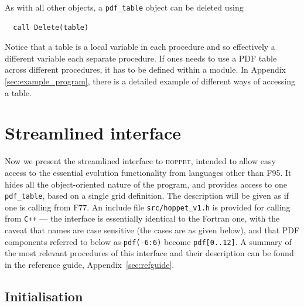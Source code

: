 \documentclass[12pt]{article}
\newcommand{\hoppet}{\textsc{hoppet}\xspace}
\newcommand{\ttt}[1]{\texttt{#1}}
\begin{document}
As with all other objects, a \ttt{pdf\_table} object can be deleted
using
\begin{lstlisting}
  call Delete(table) 
\end{lstlisting}
Notice that a table is a local variable in each procedure and so 
effectively a different variable each separate
procedure. 
If ones needs to use a 
PDF table across different procedures, it has to be 
defined within a module.
In Appendix \ref{sec:example_program}, 
there is a detailed example of different ways of
accessing a table. 






\section{Streamlined interface}
\label{sec:vanilla}

Now we present the streamlined interface to \hoppet,
intended to allow easy access
to the essential evolution functionality from languages other than
F95.  It hides all the object-oriented nature of the program, and
provides access to one \ttt{pdf\_table}, based on a single grid
definition. The description will be given as if one is calling from
F77. An include file \ttt{src/hoppet\_v1.h} is provided for calling
from {\tt C++} --- the interface is essentially identical to the Fortran
one, with the caveat that names are case sensitive (the cases are as
given below), and that PDF components referred to below as
\ttt{pdf(-6:6)} become \ttt{pdf[0..12]}. A summary of the
most relevant procedures of this interface 
and their description can be found 
in the reference guide, Appendix~\ref{sec:refguide}.

\subsection{Initialisation}
\label{sec:vanilla_initialisation}
\end{document}
